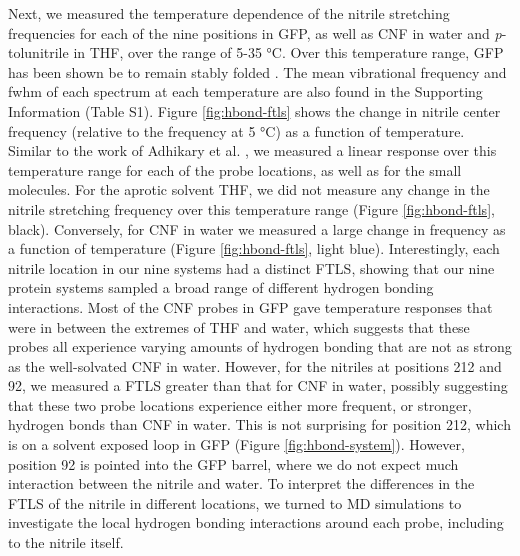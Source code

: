 Next, we measured the temperature dependence of the nitrile stretching frequencies for each of the nine positions in GFP, as well as CNF in water and \emph{p}-tolunitrile in THF, over the range of 5-35 \si{\celsius}.
Over this temperature range, GFP has been shown be to remain stably folded \cite{Slocum2016, Pedelacq2006}.
The mean vibrational frequency and fwhm of each spectrum at each temperature are also found in the Supporting Information (Table S1).
Figure \ref{fig:hbond-ftls} shows the change in nitrile center frequency (relative to the frequency at 5 \si{\celsius}) as a function of temperature.
Similar to the work of Adhikary et al. \cite{Adhikary2015}, we measured a linear response over this temperature range for each of the probe locations, as well as for the small molecules.
For the aprotic solvent THF, we did not measure any change in the nitrile stretching frequency over this temperature range (Figure \ref{fig:hbond-ftls}, black).
Conversely, for CNF in water we measured a large change in frequency as a function of temperature (Figure \ref{fig:hbond-ftls}, light blue).
Interestingly, each nitrile location in our nine systems had a distinct FTLS, showing that our nine protein systems sampled a broad range of different hydrogen bonding interactions.
Most of the CNF probes in GFP gave temperature responses that were in between the extremes of THF and water, which suggests that these probes all experience varying amounts of hydrogen bonding that are not as strong as the well-solvated CNF in water.
However, for the nitriles at positions 212 and 92, we measured a FTLS greater than that for CNF in water, possibly suggesting that these two probe locations experience either more frequent, or stronger, hydrogen bonds than CNF in water.
This is not surprising for position 212, which is on a solvent exposed loop in GFP (Figure \ref{fig:hbond-system}).
However, position 92 is pointed into the GFP barrel, where we do not expect much interaction between the nitrile and water.
To interpret the differences in the FTLS of the nitrile in different locations, we turned to MD simulations to investigate the local hydrogen bonding interactions around each probe, including to the nitrile itself. 

